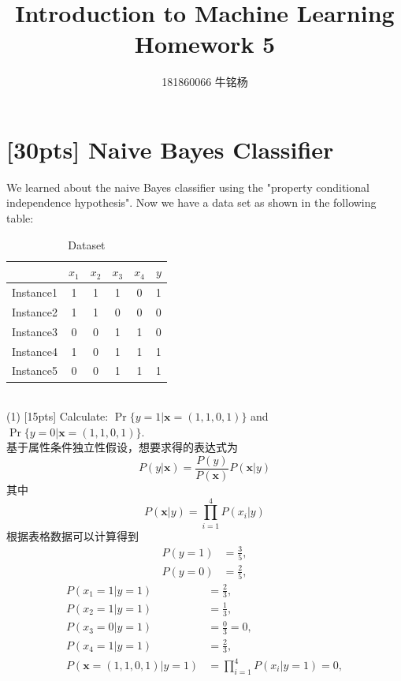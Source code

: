 \documentclass{article}
\title{Introduction to Machine Learning\\Homework 5}
\author{181860066 牛铭杨}
\begin{document}
    \maketitle
	\section{[30pts] Naive Bayes Classifier}
		
		We learned about the naive Bayes classifier using the "property conditional independence hypothesis". Now we have a data set as shown in the following table:
		\begin{table}[htp]
			\centering
			\caption{Dataset}\label{tab:aStrangeTable}
		\begin{tabular}{c|ccccc}
			\hline 
			& $x_1$ & $x_2$ & $x_3$ & $x_4$ & $y$ \\ 
			\hline 
		Instance1	& 1 & 1 & 1 & 0 & 1 \\ 
			\hline 
		Instance2	& 1 & 1 & 0 & 0 & 0 \\ 
			\hline 
		Instance3	& 0 & 0 & 1 & 1 & 0 \\ 
			\hline 
		Instance4	& 1 & 0 & 1 & 1 & 1 \\ 
			\hline 
		Instance5	& 0 & 0 & 1 & 1 & 1 \\ 
			\hline 
		\end{tabular}
        \end{table} \\
        (1) [15pts]  Calculate: $\Pr\{ y=1 | \mathbf{x}=(1,1,0,1) \}$ and $\Pr\{ y=0 | \mathbf{x}=(1,1,0,1) \}$.\\
        基于属性条件独立性假设，想要求得的表达式为
        \begin{equation}
            P(y \left| \boldsymbol{x} \right.) = \frac{P(y)}{P(\boldsymbol{x})} P(\boldsymbol{x} \left| y \right.)
        \end{equation}
        其中
        \begin{equation}
            P(\boldsymbol{x} \left| y \right.) = \prod_{i=1}^4 P(x_i \left| y \right.)
        \end{equation}
        根据表格数据可以计算得到
        \begin{align}
            P(y = 1) &= \frac{3}{5},\\
            P(y = 0) &= \frac{2}{5},
        \end{align}
        \begin{align}
            P(x_1 = 1 \left| y = 1 \right.) &= \frac{2}{3},\\
            P(x_2 = 1 \left| y = 1 \right.) &= \frac{1}{3},\\
            P(x_3 = 0 \left| y = 1 \right.) &= \frac{0}{3} = 0,\\
            P(x_4 = 1 \left| y = 1 \right.) &= \frac{2}{3},\\
            P(\boldsymbol{x} = (1,1,0,1) \left| y=1 \right.) &= \prod_{i=1}^4 P(x_i \left| y=1 \right.) = 0,
        \end{align}
\end{document}
